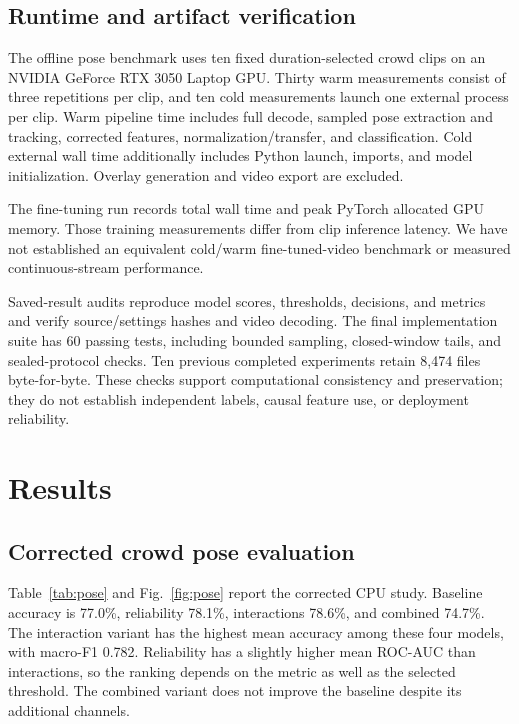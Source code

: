 \documentclass[journal]{IEEEtai}
\begin{document}
\subsection{Runtime and artifact verification}
The offline pose benchmark uses ten fixed duration-selected crowd clips on an NVIDIA GeForce RTX 3050 Laptop GPU. Thirty warm measurements consist of three repetitions per clip, and ten cold measurements launch one external process per clip. Warm pipeline time includes full decode, sampled pose extraction and tracking, corrected features, normalization/transfer, and classification. Cold external wall time additionally includes Python launch, imports, and model initialization. Overlay generation and video export are excluded.

The fine-tuning run records total wall time and peak PyTorch allocated GPU memory. Those training measurements differ from clip inference latency. We have not established an equivalent cold/warm fine-tuned-video benchmark or measured continuous-stream performance.

Saved-result audits reproduce model scores, thresholds, decisions, and metrics and verify source/settings hashes and video decoding. The final implementation suite has 60 passing tests, including bounded sampling, closed-window tails, and sealed-protocol checks. Ten previous completed experiments retain 8,474 files byte-for-byte. These checks support computational consistency and preservation; they do not establish independent labels, causal feature use, or deployment reliability.



\section{Results}
\subsection{Corrected crowd pose evaluation}
Table~\ref{tab:pose} and Fig.~\ref{fig:pose} report the corrected CPU study. Baseline accuracy is 77.0\%, reliability 78.1\%, interactions 78.6\%, and combined 74.7\%. The interaction variant has the highest mean accuracy among these four models, with macro-F1 0.782. Reliability has a slightly higher mean ROC-AUC than interactions, so the ranking depends on the metric as well as the selected threshold. The combined variant does not improve the baseline despite its additional channels.
\end{document}
